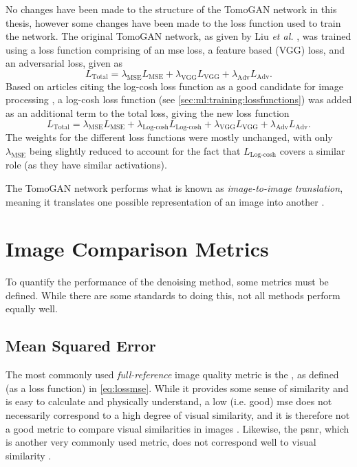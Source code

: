 No changes have been made to the structure of the TomoGAN network in this thesis, however some changes have been made to the loss function used to train the network. The original TomoGAN network, as given by Liu \textit{et al.} \cite{liu2020tomogan}, was trained using a loss function comprising of an \gls{mse} loss, a feature based (VGG) loss, and an adversarial loss, given as 
\begin{equation}
    L_{\text{Total}} = \lambda_{\text{MSE}}L_{\text{MSE}} + \lambda_{\text{VGG}}L_{\text{VGG}} + \lambda_{\text{Adv}}L_{\text{Adv}}.
\end{equation}
Based on articles citing the log-cosh loss function as a good candidate for image processing \cite{7797130,chen2019log}, a log-cosh loss function (see \cref{sec:ml:training:lossfunctions}) was added as an additional term to the total loss, giving the new loss function
\begin{equation}
    L_{\text{Total}} = \lambda_{\text{MSE}}L_{\text{MSE}} + \lambda_{\text{Log-cosh}}L_{\text{Log-cosh}} + \lambda_{\text{VGG}}L_{\text{VGG}} + \lambda_{\text{Adv}}L_{\text{Adv}}.
\end{equation}
The weights for the different loss functions were mostly unchanged, with only $\lambda_\text{MSE}$ being slightly reduced to account for the fact that $L_\text{Log-cosh}$ covers a similar role (as they have similar activations). 

The TomoGAN network performs what is known as \textit{image-to-image translation}, meaning it translates one possible representation of an image into another \cite{pang2021imagetoimage,isola2018imagetoimage}.

\section{Image Comparison Metrics}
\label{sec:method:metrics}
To quantify the performance of the denoising method, some metrics must be defined. While there are some standards to doing this, not all methods perform equally well. 

\subsection{Mean Squared Error}
\label{sec:method:metrics:mse}
The most commonly used \textit{full-reference} image quality metric is the , as defined (as a loss function) in \cref{eq:lossmse}. While it provides some sense of similarity and is easy to calculate and physically understand, a low (i.e. good) \gls{mse} does not necessarily correspond to a high degree of visual similarity, and it is therefore not a good metric to compare visual similarities in images \cite{413502,477498}. Likewise, the \gls{psnr}, which is another very commonly used metric, does not correspond well to visual similarity \cite{477498}. 

